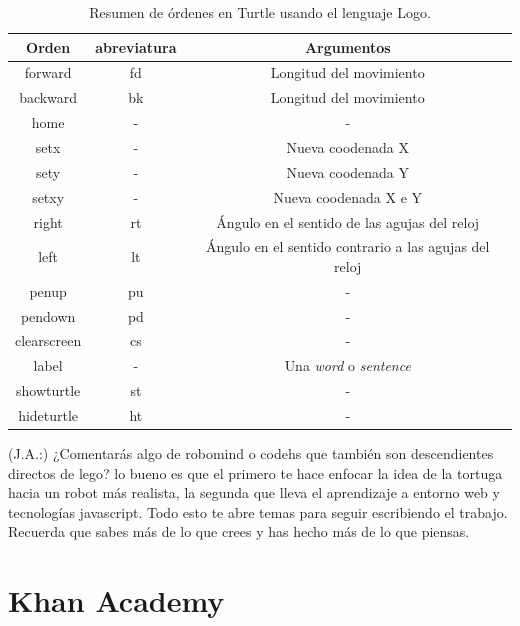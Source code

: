\begin{table}[!ht]
	\begin{centering}
		\begin{tabular}{c|c|c}
Orden & abreviatura & Argumentos\\
\hline
forward & fd & Longitud del movimiento\\
backward & bk & Longitud del movimiento\\
home & - & -\\
setx & - & Nueva coodenada X\\
sety & - & Nueva coodenada Y\\
setxy & - & Nueva coodenada X e Y\\
right & rt & Ángulo en el sentido de las agujas del reloj\\
left & lt & Ángulo en el sentido contrario a las agujas del reloj\\
penup & pu & -\\
pendown & pd & -\\
clearscreen & cs & -\\
label & - & Una \emph{word} o \emph{sentence}\\
showturtle & st & -\\
hideturtle & ht & -\\
\end{tabular}
	\caption{Resumen de órdenes en Turtle usando el lenguaje Logo.}
		\label{tab:turtle-lenguaje}
	\end{centering}
\end{table}










{\color{blue}
(J.A.:) ¿Comentarás algo de robomind o codehs que también son descendientes directos de lego? lo bueno es que el primero te hace enfocar la idea de la tortuga hacia un robot más realista, la segunda que lleva el aprendizaje a entorno web y tecnologías javascript. Todo esto te abre temas para seguir escribiendo el trabajo. Recuerda que sabes más de lo que crees y has hecho más de lo que piensas.
}


\section{Khan Academy}
\label{sec:Khan Academy}

